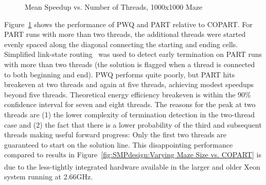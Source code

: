 \begin{figure}[tb]
\begin{center}
\end{center}
\caption{Mean Speedup vs. Number of Threads, 1000x1000 Maze}
\label{fig:SMPdesign:Mean Speedup vs. Number of Threads, 1000x1000 Maze}
\end{figure}

Figure~\ref{fig:SMPdesign:Mean Speedup vs. Number of Threads, 1000x1000 Maze}
shows the performance of PWQ and PART relative to COPART.
For PART runs with more than two threads, the additional threads were
started evenly spaced along the diagonal connecting the starting and
ending cells.
Simplified link-state routing~\cite{BERT-87} was used to
detect early termination on PART runs with more than two threads
(the solution is flagged when
a thread is connected to both beginning and end).
PWQ performs quite poorly, but
PART hits breakeven at two threads and again at five threads, achieving
modest speedups beyond five threads.
Theoretical energy efficiency breakeven is within the 90\% confidence
interval for seven and eight threads.
The reasons for the peak at two threads are (1) the lower complexity
of termination detection in the two-thread case and (2) the fact that
there is a lower probability of the third and subsequent threads making
useful forward progress: Only the first two threads are guaranteed to start on
the solution line.
This disappointing performance compared to results in
Figure~\ref{fig:SMPdesign:Varying Maze Size vs. COPART}
is due to the less-tightly integrated hardware available in the
larger and older Xeon\textsuperscript\textregistered
system running at 2.66GHz.

